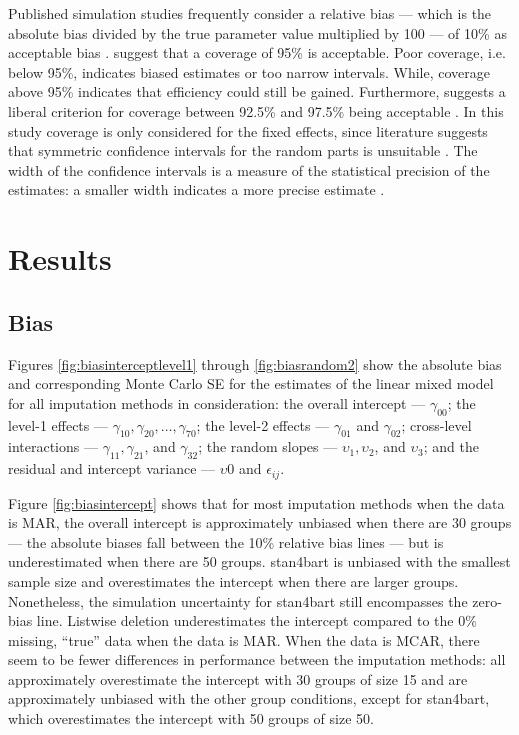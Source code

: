 \documentclass[3p,12pt,a4paper]{elsarticle}
\begin{document}
Published simulation studies frequently consider a relative bias --- which is the absolute bias divided by the true parameter value multiplied by 100 --- of 10\% as acceptable bias \citep{enders2018,enders2018a,enders2020,finch1997}. \citet{morris2019,enders2018,oberman2023,buurenFlexibleImputationMissing2018} suggest that a coverage of 95\% is acceptable. Poor coverage, i.e. below 95\%, indicates biased estimates or too narrow intervals. While, coverage above 95\% indicates that efficiency could still be gained. Furthermore, \citet{bradley1978} suggests a liberal criterion for coverage between 92.5\% and 97.5\% being acceptable \citep{enders2018,enders2018a,enders2020}. In this study coverage is only considered for the fixed effects, since literature suggests that symmetric confidence intervals for the random parts is unsuitable \citep{enders2018,enders2018a,enders2020,maas2005}.
The width of the confidence intervals is a measure of the statistical precision of the estimates: a smaller width indicates a more precise estimate \citep{oberman2023,buurenFlexibleImputationMissing2018}.

\section{Results}
\graphicspath{{./graphs/}}
\subsection{Bias}
Figures \ref{fig:biasinterceptlevel1} through \ref{fig:biasrandom2} show the absolute bias and corresponding Monte Carlo SE for the estimates of the linear mixed model for all imputation methods in consideration: the overall intercept --- $\gamma_{00}$; the level-1 effects --- $\gamma_{10}, \gamma_{20},\dots,\gamma_{70}$; the level-2 effects --- $\gamma_{01}$ and $\gamma_{02}$; cross-level interactions --- $\gamma_{11}, \gamma_{21}$, and $\gamma_{32}$; the random slopes --- $\upsilon_{1}, \upsilon_{2}$, and $\upsilon_{3}$; and the residual and intercept variance --- $\upsilon{0}$ and $\epsilon_{ij}$.

Figure \ref{fig:biasintercept} shows that for most imputation methods when the data is MAR, the overall intercept is approximately unbiased when there are 30 groups --- the absolute biases fall between the 10\% relative bias lines --- but is underestimated when there are 50 groups. stan4bart is unbiased with the smallest sample size and overestimates the intercept when there are larger groups. Nonetheless, the simulation uncertainty for stan4bart still encompasses the zero-bias line. Listwise deletion underestimates the intercept compared to the 0\% missing, ``true'' data when the data is MAR.  
When the data is MCAR, there seem to be fewer differences in performance between the imputation methods: all approximately overestimate the intercept with 30 groups of size 15 and are approximately unbiased with the other group conditions, except for stan4bart, which overestimates the intercept with 50 groups of size 50. 
\end{document}
